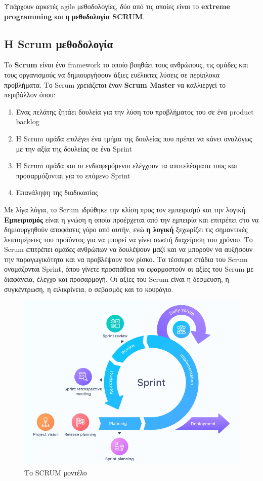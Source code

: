 Υπάρχουν αρκετές agile μεθοδολογίες, δύο από τις οποίες είναι το \textbf{extreme programming} και η \textbf{μεθοδολογία SCRUM}.

\subsection{Η Scrum μεθοδολογία}

To \textbf{Scrum} είναι ένα framework το οποίο βοηθάει τους ανθρώπους, τις ομάδες και τους οργανισμούς να δημιουργήσουν άξιες ευέλικτες λύσεις σε περίπλοκα προβλήματα.
Το Scrum χρειάζεται έναν \textbf{Scrum Master} να καλλιεργεί το περιβάλλον όπου:

\begin{enumerate}
  \item Ένας πελάτης ζητάει δουλεία για την λύση του προβλήματος του σε ένα product backlog
  \item Η Scrum ομάδα επιλέγει ένα τμήμα της δουλείας που πρέπει να κάνει αναλόγως με την αξία της δουλείας σε ένα Sprint
  \item Η Scrum ομάδα και οι ενδιαφερόμενοι ελέγχουν τα αποτελέσματα τους και προσαρμόζονται για το επόμενο Sprint
  \item Επανάληψη της διαδικασίας
\end{enumerate}

Με λίγα λόγια, το Scrum ιδρύθηκε την κλίση προς τον εμπειρισμό και την λογική.
\textbf{Εμπειρισμός} είναι η γνώση η οποία προέρχεται από την εμπειρία και επιτρέπει στο να δημιουργηθούν αποφάσεις γύρο από αυτήν, ενώ \textbf{η λογική} ξεχωρίζει τις σημαντικές λεπτομέρειες του προϊόντος για να μπορεί να γίνει σωστή διαχείριση του χρόνου.
Το Scrum επιτρέπει ομάδες ανθρώπων να δουλέψουν μαζί και να μπορούν να αυξήσουν την παραγωγικότητα και να προβλέψουν τον ρίσκο.
Τα τέσσερα στάδια του Scrum ονομάζονται Sprint, όπου γίνετε προσπάθεια να εφαρμοστούν οι αξίες του Scrum με διαφάνεια, έλεγχο και προσαρμογή.
Οι αξίες του Scrum είναι η δέσμευση, η συγκέντρωση, η ειλικρίνεια, ο σεβασμός και το κουράγιο.

\begin{figure}[H]
  \centering
  \includegraphics[width=150mm]{Figures/scrum.png}
  \caption[Το SCRUM μοντέλο]{Το SCRUM μοντέλο}
  \label{fig:scrum}
\end{figure}

